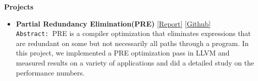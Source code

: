 \documentclass[9pt]{article}
\newenvironment{changemargin}[2]{%
  \begin{list}{}{%
    \setlength{\topsep}{0pt}%
    \setlength{\leftmargin}{#1}%
    \setlength{\rightmargin}{#2}%
    \setlength{\listparindent}{\parindent}%
    \setlength{\itemindent}{\parindent}%
    \setlength{\parsep}{\parskip}%
  }%
  \item[]}{\end{list}
}
\newenvironment{body} {
	\vspace*{-16pt}
	\begin{changemargin}{-0.25in}{-0.5in}
  }	
	{\end{changemargin}
}
\begin{document}
\begin{body}
	\vspace{14pt}
	\textbf{Projects}{} \hfill  \\
	\begin{itemize} \itemsep -0pt
           \item \textbf{Partial Redundancy Elimination(PRE)} 
           \href{http://web.engr.illinois.edu/~sdasgup3/Document/report_cs526.pdf}{[Report]} 
           \href{https://github.com/sdasgup3/PartialRedundancyElimination}{[Github]} \\
                                  \texttt{Abstract: }PRE is a compiler optimization that
                                  eliminates expressions that are redundant on
                                  some but not necessarily all paths through a
                                  program. In this project, we implemented a PRE
                                  optimization pass in LLVM and measured results
                                  on a variety of applications and did a detailed 
                                  study on the performance numbers. 


\end{itemize}
\end{body}
\end{document}

